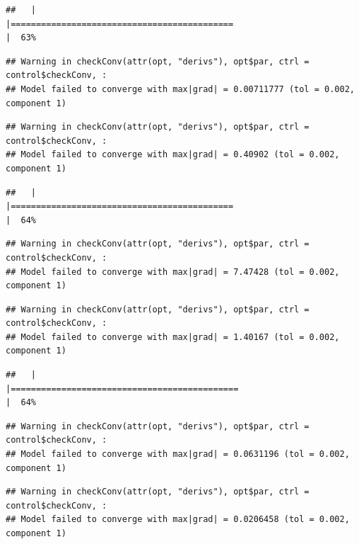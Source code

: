 \documentclass[
  12pt,
]{book}
\begin{document}
\begin{verbatim}
##   |                                                                              |============================================                          |  63%
\end{verbatim}

\begin{verbatim}
## Warning in checkConv(attr(opt, "derivs"), opt$par, ctrl = control$checkConv, :
## Model failed to converge with max|grad| = 0.00711777 (tol = 0.002, component 1)
\end{verbatim}

\begin{verbatim}
## Warning in checkConv(attr(opt, "derivs"), opt$par, ctrl = control$checkConv, :
## Model failed to converge with max|grad| = 0.40902 (tol = 0.002, component 1)
\end{verbatim}

\begin{verbatim}
##   |                                                                              |============================================                          |  64%
\end{verbatim}

\begin{verbatim}
## Warning in checkConv(attr(opt, "derivs"), opt$par, ctrl = control$checkConv, :
## Model failed to converge with max|grad| = 7.47428 (tol = 0.002, component 1)
\end{verbatim}

\begin{verbatim}
## Warning in checkConv(attr(opt, "derivs"), opt$par, ctrl = control$checkConv, :
## Model failed to converge with max|grad| = 1.40167 (tol = 0.002, component 1)
\end{verbatim}

\begin{verbatim}
##   |                                                                              |=============================================                         |  64%
\end{verbatim}

\begin{verbatim}
## Warning in checkConv(attr(opt, "derivs"), opt$par, ctrl = control$checkConv, :
## Model failed to converge with max|grad| = 0.0631196 (tol = 0.002, component 1)
\end{verbatim}

\begin{verbatim}
## Warning in checkConv(attr(opt, "derivs"), opt$par, ctrl = control$checkConv, :
## Model failed to converge with max|grad| = 0.0206458 (tol = 0.002, component 1)
\end{verbatim}
\end{document}
